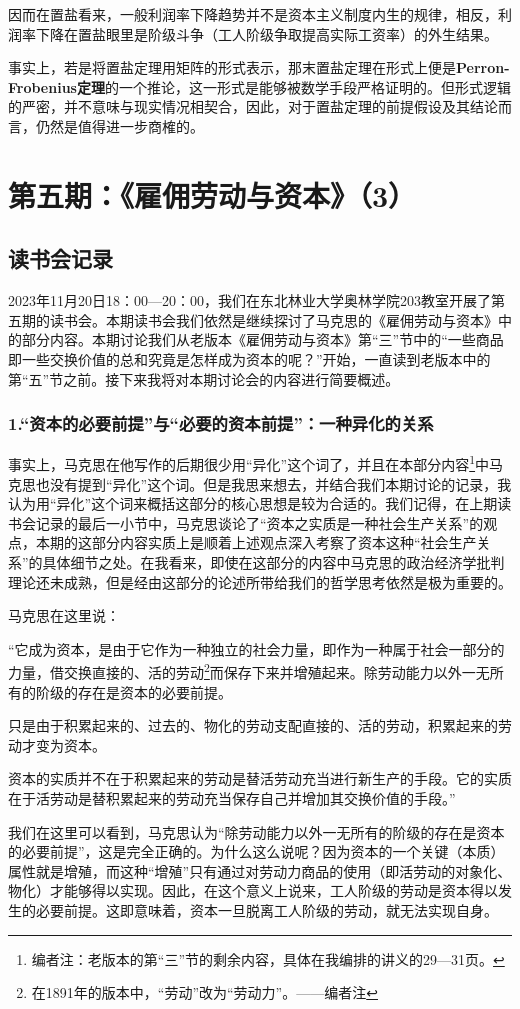 \documentclass[a4paper,twoside,12pt,AutoFakeBold]{ctexart}
\begin{document}
因而在置盐看来，一般利润率下降趋势并不是资本主义制度内生的规律，相反，利润率下降在置盐眼里是阶级斗争（工人阶级争取提高实际工资率）的外生结果。

事实上，若是将置盐定理用矩阵的形式表示，那末置盐定理在形式上便是\textbf{Perron-Frobenius定理}的一个推论，这一形式是能够被数学手段严格证明的。但形式逻辑的严密，并不意味与现实情况相契合，因此，对于置盐定理的前提假设及其结论而言，仍然是值得进一步商榷的。
\newpage
\section{第五期：《雇佣劳动与资本》（3）}
\subsection{读书会记录}
2023年11月20日18：00—20：00，我们在东北林业大学奥林学院203教室开展了第五期的读书会。本期读书会我们依然是继续探讨了马克思的《雇佣劳动与资本》中的部分内容。本期讨论我们从老版本《雇佣劳动与资本》第“三”节中的“一些商品即一些交换价值的总和究竟是怎样成为资本的呢？”开始，一直读到老版本中的第“五”节之前。接下来我将对本期讨论会的内容进行简要概述。
\subsubsection{1.“资本的必要前提”与“必要的资本前提”：一种异化的关系}
事实上，马克思在他写作的后期很少用“异化”这个词了，并且在本部分内容\footnote{编者注：老版本的第“三”节的剩余内容，具体在我编排的讲义的29—31页。}中马克思也没有提到“异化”这个词。但是我思来想去，并结合我们本期讨论的记录，我认为用“异化”这个词来概括这部分的核心思想是较为合适的。我们记得，在上期读书会记录的最后一小节中，马克思谈论了“资本之实质是一种社会生产关系”的观点，本期的这部分内容实质上是顺着上述观点深入考察了资本这种“社会生产关系”的具体细节之处。在我看来，即使在这部分的内容中马克思的政治经济学批判理论还未成熟，但是经由这部分的论述所带给我们的哲学思考依然是极为重要的。

马克思在这里说：
\begin{adjustwidth}{2em}{2em}
    \qquad\fangsong
“它成为资本，是由于它作为一种独立的社会力量，即作为一种属于社会一部分的力量，借交换直接的、活的劳动\footnote{在1891年的版本中，“劳动”改为“劳动力”。——编者注}而保存下来并增殖起来。除劳动能力以外一无所有的阶级的存在是资本的必要前提。

只是由于积累起来的、过去的、物化的劳动支配直接的、活的劳动，积累起来的劳动才变为资本。

资本的实质并不在于积累起来的劳动是替活劳动充当进行新生产的手段。它的实质在于活劳动是替积累起来的劳动充当保存自己并增加其交换价值的手段。”
\end{adjustwidth}
我们在这里可以看到，马克思认为“除劳动能力以外一无所有的阶级的存在是资本的必要前提”，这是完全正确的。为什么这么说呢？因为资本的一个关键（本质）属性就是增殖，而这种“增殖”只有通过对劳动力商品的使用（即活劳动的对象化、物化）才能够得以实现。因此，在这个意义上说来，工人阶级的劳动是资本得以发生的必要前提。这即意味着，资本一旦脱离工人阶级的劳动，就无法实现自身。
\end{document}
